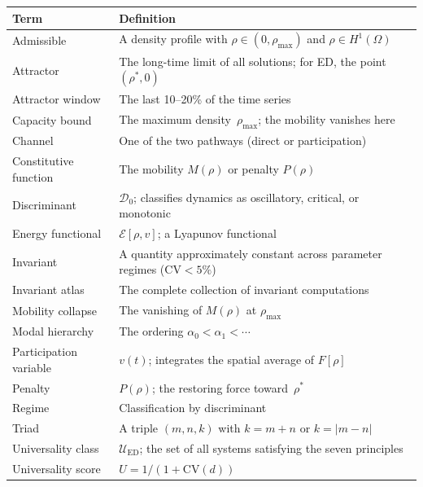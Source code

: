 \documentclass[11pt,twoside,openright]{book}
\theoremstyle{definition}
\theoremstyle{plain}
\theoremstyle{definition}
\theoremstyle{remark}
\newcommand{\rhomax}{\rho_{\max}}
\newcommand{\rhostar}{\rho^{*}}
\newcommand{\Fop}{F[\rho]}
\newcommand{\Energy}{\mathcal{E}}
\newcommand{\Disc}{\mathscr{D}_0}
\newcommand{\UED}{\mathcal{U}_{\mathrm{ED}}}
\newcommand{\CV}{\mathrm{CV}}
\begin{document}
\begin{longtable}{@{}lp{8cm}@{}}
\toprule
\textbf{Term} & \textbf{Definition} \\
\midrule
\endhead
Admissible & A density profile with \(\rho \in (0, \rhomax)\) and \(\rho \in H^1(\Omega)\) \\
Attractor & The long-time limit of all solutions; for ED, the point \((\rhostar, 0)\) \\
Attractor window & The last 10--20\% of the time series \\
Capacity bound & The maximum density~\(\rhomax\); the mobility vanishes here \\
Channel & One of the two pathways (direct or participation) \\
Constitutive function & The mobility \(M(\rho)\) or penalty \(P(\rho)\) \\
Discriminant & \(\Disc\); classifies dynamics as oscillatory, critical, or monotonic \\
Energy functional & \(\Energy[\rho,v]\); a Lyapunov functional \\
Invariant & A quantity approximately constant across parameter regimes (\(\CV < 5\%\)) \\
Invariant atlas & The complete collection of invariant computations \\
Mobility collapse & The vanishing of \(M(\rho)\) at \(\rhomax\) \\
Modal hierarchy & The ordering \(\alpha_0 < \alpha_1 < \cdots\) \\
Participation variable & \(v(t)\); integrates the spatial average of \(\Fop\) \\
Penalty & \(P(\rho)\); the restoring force toward~\(\rhostar\) \\
Regime & Classification by discriminant \\
Triad & A triple \((m,n,k)\) with \(k = m+n\) or \(k = |m-n|\) \\
Universality class & \(\UED\); the set of all systems satisfying the seven principles \\
Universality score & \(U = 1/(1 + \CV(d))\) \\
\bottomrule
\end{longtable}


\printbibliography[heading=bibintoc,title={References}]
\end{document}
